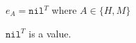 \begin{case}

$e_{A}=\mathtt{nil}^{T}$ where $A\in\lbrace H,M\rbrace$

$\mathtt{nil}^{T}$ is a value.

\end{case}